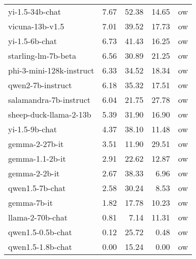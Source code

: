 \begin{tabular}{lrrrl}
$$yi-1.5-34b-chat & 7.67 & 52.38 & 14.65 & ow \\
vicuna-13b-v1.5 & 7.01 & 39.52 & 17.73 & ow \\
yi-1.5-6b-chat & 6.73 & 41.43 & 16.25 & ow \\
starling-lm-7b-beta & 6.56 & 30.89 & 21.25 & ow \\
phi-3-mini-128k-instruct & 6.33 & 34.52 & 18.34 & ow \\
qwen2-7b-instruct & 6.18 & 35.32 & 17.51 & ow \\
salamandra-7b-instruct & 6.04 & 21.75 & 27.78 & ow \\
sheep-duck-llama-2-13b & 5.39 & 31.90 & 16.90 & ow \\
yi-1.5-9b-chat & 4.37 & 38.10 & 11.48 & ow \\
gemma-2-27b-it & 3.51 & 11.90 & 29.51 & ow \\
gemma-1.1-2b-it & 2.91 & 22.62 & 12.87 & ow \\
gemma-2-2b-it & 2.67 & 38.33 & 6.96 & ow \\
qwen1.5-7b-chat & 2.58 & 30.24 & 8.53 & ow \\
gemma-7b-it & 1.82 & 17.78 & 10.23 & ow \\
llama-2-70b-chat & 0.81 & 7.14 & 11.31 & ow \\
qwen1.5-0.5b-chat & 0.12 & 25.72 & 0.48 & ow \\
qwen1.5-1.8b-chat & 0.00 & 15.24 & 0.00 & ow \\
\bottomrule
\end{tabular}
